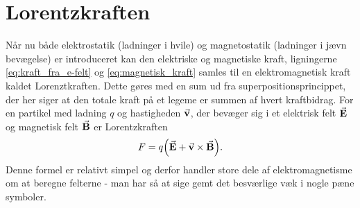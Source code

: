 \section{Lorentzkraften}
Når nu både elektrostatik (ladninger i hvile) og magnetostatik (ladninger i jævn bevægelse) er introduceret kan den elektriske og magnetiske kraft, ligningerne \eqref{eq:kraft_fra_e-felt} og \eqref{eq:magnetisk_kraft} samles til en elektromagnetisk kraft kaldet Lorenztkraften. Dette gøres med en sum ud fra superpositionsprincippet, der her siger at den totale kraft på et legeme er summen af hvert kraftbidrag. For en partikel med ladning $q$ og hastigheden $\va v$, der bevæger sig i et elektrisk felt $\va E$ og magnetisk felt $\va B$ er Lorentzkraften
%
\begin{align}
    F = q \Big(\va E + \va v \times \va B\Big).
\end{align}
%
Denne formel er relativt simpel og derfor handler store dele af elektromagnetisme om at beregne felterne - man har så at sige gemt det besværlige væk i nogle pæne symboler.
